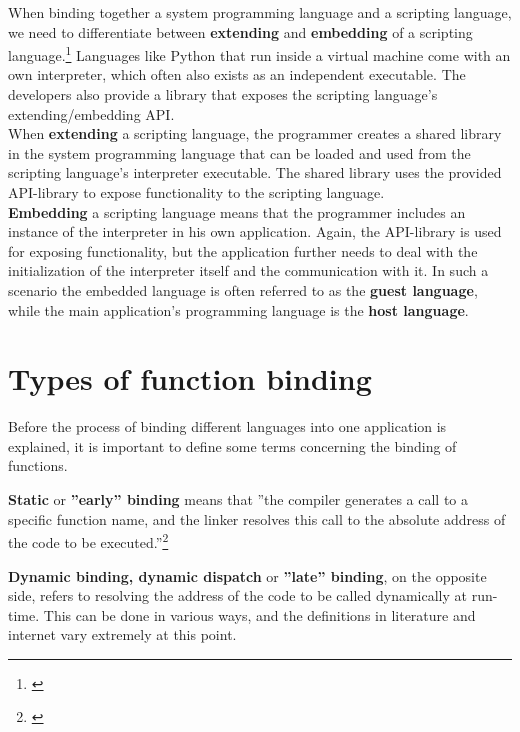 When binding together a system programming language and a scripting language, we need to differentiate between \textbf{extending} and \textbf{embedding} of a scripting language.\footnote{\citep{PythonHP}} Languages like Python that run inside a virtual machine come with an own interpreter, which often also exists as an independent executable. The developers also provide a library that exposes the scripting language's extending/embedding API. \\
When \textbf{extending} a scripting language, the programmer creates a shared library in the system programming language that can be loaded and used from the scripting language's interpreter executable. The shared library uses the provided API-library to expose functionality to the scripting language.\\
\textbf{Embedding} a scripting language means that the programmer includes an instance of the interpreter in his own application. Again, the API-library is used for exposing functionality, but the application further needs to deal with the initialization of the interpreter itself and the communication with it. In such a scenario the embedded language is often referred to as the \textbf{guest language}, while the main application's programming language is the \textbf{host language}.

\section{Types of function binding}
\label{sec:TypesOfFunctionBinding}

Before the process of binding different languages into one application is explained, it is important to define some terms concerning the binding of functions.

\textbf{Static} or \textbf{''early'' binding} means that ''the compiler generates a call to a specific function name, and the linker resolves this call to the absolute address of the code to be executed.''\footnote{\citep[41]{ThinkingInCPP}}

\textbf{Dynamic binding, dynamic dispatch} or \textbf{''late'' binding}, on the opposite side, refers to resolving the address of the code to be called dynamically at run-time. This can be done in various ways, and the definitions in literature and internet vary extremely at this point.

